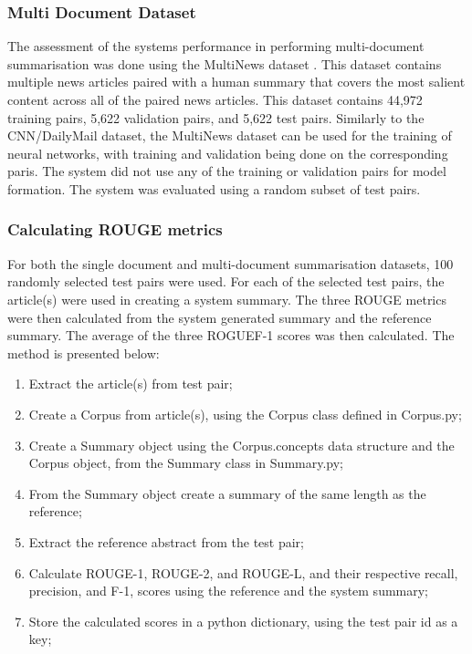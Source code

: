 \subsubsection{Multi Document Dataset}
The assessment of the systems performance in performing multi-document summarisation was done using the MultiNews dataset \citep{fabbri2019multi}. This dataset contains multiple news articles paired with a human summary that covers the most salient content across all of the paired news articles. This dataset contains 44,972 training pairs, 5,622 validation pairs, and 5,622 test pairs. Similarly to the CNN/DailyMail dataset, the MultiNews dataset can be used for the training of neural networks, with training and validation being done on the corresponding paris. The system did not use any of the training or validation pairs for model formation. The system was evaluated using a random subset of test pairs. 

\subsubsection{Calculating ROUGE metrics}
For both the single document and multi-document summarisation datasets, 100 randomly selected test pairs were used. For each of the selected test pairs, the article(s) were used in creating a system summary. The three ROUGE metrics were then calculated from the system generated summary and the reference summary. The average of the three ROGUEF-1 scores was then calculated. The method is presented below:

\begin{enumerate}
    \item Extract the article(s) from test pair;
    \item Create a Corpus from article(s), using the Corpus class defined in Corpus.py;
    \item Create a Summary object using the Corpus.concepts data structure and the Corpus object, from the Summary class in Summary.py;
    \item From the Summary object create a summary of the same length as the reference;
    \item Extract the reference abstract from the test pair;
    \item Calculate ROUGE-1, ROUGE-2, and ROUGE-L, and their respective recall, precision, and F-1, scores using the reference and the system summary;
    \item Store the calculated scores in a python dictionary, using the test pair id as a key;
\end{enumerate}

